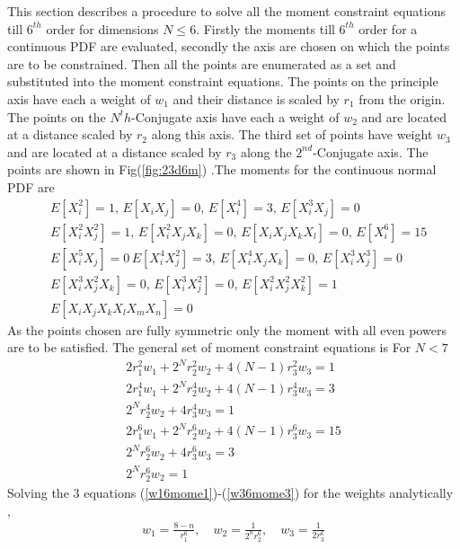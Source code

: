 \documentclass[letterpaper, 10 pt, conference]{ieeeconf}  %
\begin{document}
This section describes a procedure to solve all the moment constraint equations till $6^{th}$ order for dimensions $N\le6$. Firstly the moments till $6^{th}$ order for a continuous PDF are evaluated, secondly the axis are chosen on which the points are to be constrained. Then all the points are enumerated as a set and substituted into the moment constraint equations. The points on the principle axis have each a weight of $w_1$ and their distance is scaled by $r_1$ from the origin. The points on the $N^th$-Conjugate axis have each a weight of $w_2$ and are located at a distance scaled by $r_2$ along this axis. The third set of points have weight $w_3$ and are located at a distance scaled by $r_3$ along the $2^{nd}$-Conjugate axis.  The points are shown in Fig(\ref{fig:23d6m}) .The moments for the continuous normal PDF are    
\setlength{\arraycolsep}{0.0em}
\begin{eqnarray}
&E[X_i^2]=1,\, E[X_iX_j]=0, \, E[X_i^4]=3, \, E[X_i^3X_j]=0 \nonumber\\
&E[X_i^2X_j^2]=1, \, E[X_i^2X_jX_k]=0,\, E[X_iX_jX_kX_l]=0, \, E[X_i^6]=15\nonumber\\
&E[X_i^5X_j]=0 \, E[X_i^4X_j^2]=3,\, E[X_i^4X_jX_k]=0, \, E[X_i^3X_j^3]=0\nonumber\\
&E[X_i^3X_j^2X_k]=0, \, E[X_i^3X_j^2]=0,\,E[X_i^2X_j^2X_k^2]=1 \nonumber\\
&E[X_iX_jX_kX_lX_mX_n]=0\label{6thmoms}
\end{eqnarray}
\setlength{\arraycolsep}{5pt}
As the points chosen are fully symmetric only the moment with all even powers are to be satisfied. The general set of moment constraint equations is\newline
For $N<7$
\setlength{\arraycolsep}{0.0em}
\begin{eqnarray}
2r_1^2w_1+2^Nr_2^2w_2+4(N-1)r_3^2w_3=1\label{r16mome1}\\
2r_1^4w_1+2^Nr_2^4w_2+4(N-1)r_3^4w_3=3\label{r26mome2}\\
2^Nr_2^4w_2+4r_3^4w_3=1\label{r36mome3}\\
2r_1^6w_1+2^Nr_2^6w_2+4(N-1)r_3^6w_3=15\label{w16mome1}\\
2^Nr_2^6w_2+4r_3^6w_3=3\label{w26mome2}\\
2^Nr_2^6w_2=1\label{w36mome3}
\end{eqnarray}
\setlength{\arraycolsep}{5pt}
Solving the 3 equations (\ref{w16mome1})-(\ref{w36mome3}) for the weights analytically ,
 \setlength{\arraycolsep}{0.0em}
\begin{eqnarray}
w_1=\frac{8-n}{r_1^6},\quad w_2=\frac{1}{2^nr_2^6}, \quad w_3=\frac{1}{2r_3^6}
\end{eqnarray}
\end{document}
